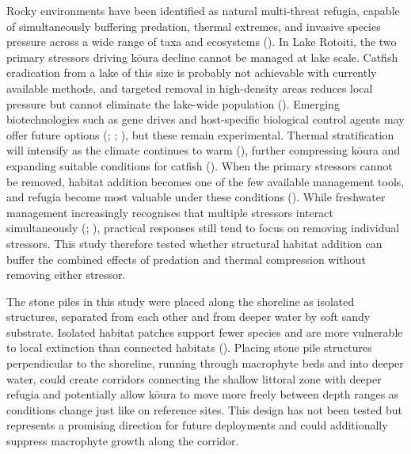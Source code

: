 \documentclass[
  letterpaper,
  DIV=11,
  numbers=noendperiod]{scrartcl}
\begin{document}
Rocky environments have been identified as natural multi-threat refugia,
capable of simultaneously buffering predation, thermal extremes, and
invasive species pressure across a wide range of taxa and ecosystems
(). In Lake Rotoiti,
the two primary stressors driving kōura decline cannot be managed at
lake scale. Catfish eradication from a lake of this size is probably not
achievable with currently available methods, and targeted removal in
high-density areas reduces local pressure but cannot eliminate the
lake-wide population (). Emerging
biotechnologies such as gene drives and host-specific biological control
agents may offer future options (; ;
), but these remain
experimental. Thermal stratification will intensify as the climate
continues to warm (),
further compressing kōura and expanding suitable conditions for catfish
(). When the primary stressors
cannot be removed, habitat addition becomes one of the few available
management tools, and refugia become most valuable under these
conditions (). While
freshwater management increasingly recognises that multiple stressors
interact simultaneously (;
), practical responses
still tend to focus on removing individual stressors. This study
therefore tested whether structural habitat addition can buffer the
combined effects of predation and thermal compression without removing
either stressor.

The stone piles in this study were placed along the shoreline as
isolated structures, separated from each other and from deeper water by
soft sandy substrate. Isolated habitat patches support fewer species and
are more vulnerable to local extinction than connected habitats
(). Placing stone pile structures
perpendicular to the shoreline, running through macrophyte beds and into
deeper water, could create corridors connecting the shallow littoral
zone with deeper refugia and potentially allow kōura to move more freely
between depth ranges as conditions change just like on reference sites.
This design has not been tested but represents a promising direction for
future deployments and could additionally suppress macrophyte growth
along the corridor.
\end{document}
